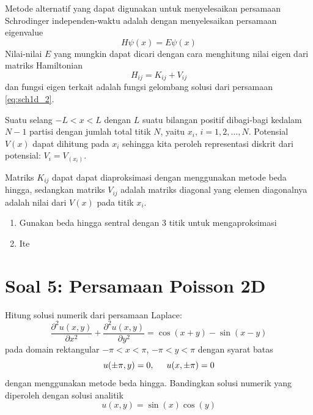 \documentclass[12pt,bahasa]{article}
\begin{document}
Metode alternatif
yang dapat digunakan untuk menyelesaikan persamaan
Schrodinger independen-waktu adalah dengan menyelesaikan
persamaan eigenvalue
\begin{equation}
H\psi(x) = E\psi(x)
\end{equation}
Nilai-nilai $E$ yang mungkin dapat dicari dengan cara menghitung
nilai eigen dari matriks Hamiltonian 
\begin{equation}
H_{ij} = K_{ij} + V_{ij}
\end{equation}
dan fungsi eigen terkait adalah fungsi gelombang solusi dari
persamaan \eqref{eq:sch1d_2}.

Suatu selang $-L < x < L$ dengan $L$ suatu bilangan positif
dibagi-bagi kedalam $N-1$ partisi dengan jumlah total titik $N$,
yaitu $x_{i}$, $i = 1, 2, \ldots, N$.
Potensial $V(x)$ dapat dihitung pada $x_{i}$ sehingga
kita peroleh representasi diskrit dari potensial:
$V_{i} = V_(x_{i})$.

Matriks $K_{ij}$ dapat
dapat diaproksimasi dengan menggunakan metode beda hingga, sedangkan
matriks $V_{ij}$ adalah matriks diagonal yang elemen diagonalnya adalah
nilai dari $V(x)$ pada titik $x_{i}$.

\begin{enumerate}[label=(\alph*)]
\item Gunakan beda hingga sentral dengan 3 titik untuk mengaproksimasi
\item Ite
\end{enumerate}


\section{Soal 5: Persamaan Poisson 2D}

Hitung solusi numerik dari persamaan Laplace:
\begin{equation}
\frac{\partial^2 u(x,y)}{\partial x^2} +
\frac{\partial^2 u(x,y)}{\partial y^2} = \cos(x + y) - \sin(x - y)
\end{equation}
pada domain rektangular $-\pi < x < \pi$, $-\pi < y < \pi$ dengan syarat batas
\begin{equation}
u(\pm\pi,y) = 0, \hspace{0.5cm} u(x,\pm\pi) = 0
\end{equation}
dengan menggunakan metode beda hingga. Bandingkan solusi numerik yang diperoleh dengan
solusi analitik
\begin{equation}
u(x,y) = \sin(x)\cos(y)
\end{equation}
\end{document}
